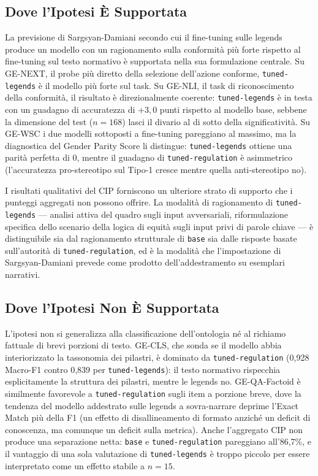 \documentclass[pdflatex, sn-apa]{sn-jnl}%
\theoremstyle{thmstyleone}%
\theoremstyle{thmstyletwo}%
\theoremstyle{thmstylethree}%
\newcommand{\modelbase}{\texttt{base}}
\newcommand{\modellegends}{\texttt{tuned-legends}}
\newcommand{\modelreg}{\texttt{tuned-regulation}}
\begin{document}
\subsection{Dove l'Ipotesi È Supportata}
\label{sec:disc:supported}

La previsione di Sargsyan-Damiani secondo cui il fine-tuning sulle legends produce
un modello con un ragionamento sulla conformità più forte rispetto al fine-tuning
sul testo normativo è supportata nella sua formulazione centrale. Su GE-NEXT, il
probe più diretto della selezione dell'azione conforme, \modellegends{} è il
modello più forte sul task. Su GE-NLI, il task di riconoscimento della conformità,
il risultato è direzionalmente coerente: \modellegends{} è in testa con un
guadagno di accuratezza di $+3,0$ punti rispetto al modello base, sebbene la
dimensione del test ($n=168$) lasci il divario al di sotto della significatività.
Su GE-WSC i due modelli sottoposti a fine-tuning pareggiano al massimo, ma la
diagnostica del Gender Parity Score li distingue: \modellegends{} ottiene una
parità perfetta di 0, mentre il guadagno di \modelreg{} è asimmetrico
(l'accuratezza pro-stereotipo sul Tipo-1 cresce mentre quella anti-stereotipo no).

I risultati qualitativi del CIP forniscono un ulteriore strato di supporto che i
punteggi aggregati non possono offrire. La modalità di ragionamento di
\modellegends{} --- analisi attiva del quadro sugli input avversariali,
riformulazione specifica dello scenario della logica di equità sugli input privi di
parole chiave --- è distinguibile sia dal ragionamento strutturale di \modelbase{}
sia dalle risposte basate sull'autorità di \modelreg{}, ed è la modalità che
l'impostazione di Sargsyan-Damiani prevede come prodotto dell'addestramento su
esemplari narrativi.


\subsection{Dove l'Ipotesi Non È Supportata}
\label{sec:disc:notsupported}

L'ipotesi non si generalizza alla classificazione dell'ontologia né al richiamo
fattuale di brevi porzioni di testo. GE-CLS, che sonda se il modello abbia
interiorizzato la tassonomia dei pilastri, è dominato da \modelreg{} (0,928
Macro-F1 contro 0,839 per \modellegends): il testo normativo rispecchia
esplicitamente la struttura dei pilastri, mentre le legends no. GE-QA-Factoid è
similmente favorevole a \modelreg{} sugli item a porzione breve, dove la tendenza
del modello addestrato sulle legends a sovra-narrare deprime l'Exact Match più
della F1 (un effetto di disallineamento di formato anziché un deficit di
conoscenza, ma comunque un deficit sulla metrica). Anche l'aggregato CIP non
produce una separazione netta: \modelbase{} e \modelreg{} pareggiano all'86,7\%, e
il vantaggio di una sola valutazione di \modellegends{} è troppo piccolo per essere
interpretato come un effetto stabile a $n=15$.
\end{document}
